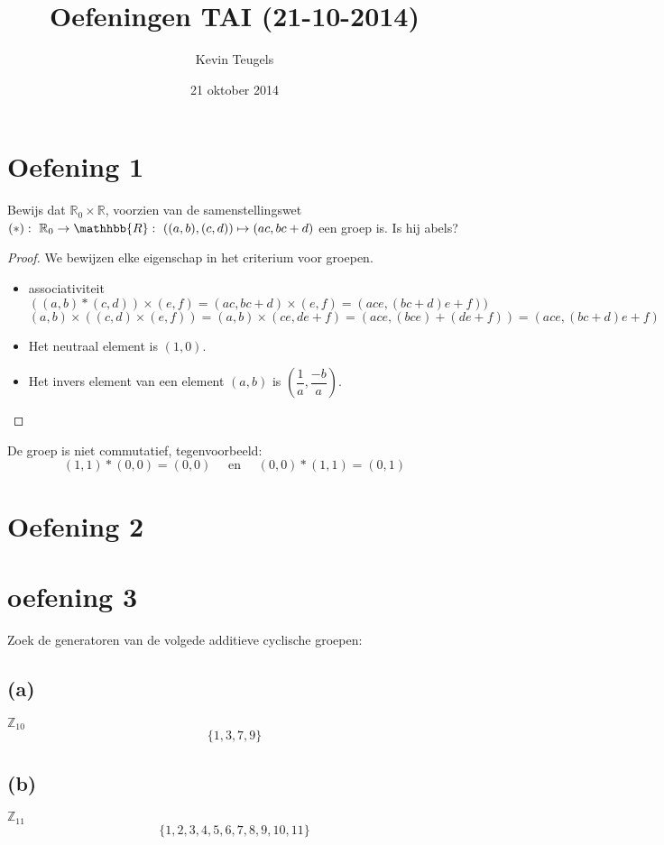 \documentclass[12pt,a4paper]{article}
\author{Kevin Teugels}
\title{Oefeningen TAI (21-10-2014)}
\date{21 oktober 2014}
\begin{document}
\maketitle
\section*{Oefening 1}

Bewijs dat $\mathbb{R}_0 \times \mathbb{R}$, voorzien van de samenstellingswet $(*):\ \mathbb{R}_{0}\rightarrow \mathhbb{R}:\ ((a,b),(c,d)) \mapsto (ac,bc+d)$ een groep is. Is hij abels?
\begin{proof} 
We bewijzen elke eigenschap in het criterium voor groepen.
\begin{itemize}
  \item associativiteit
  \[
  ((a,b)*(c,d))\times (e,f)=(ac,bc+d)\times (e,f)=(ace,(bc+d)e+f))
  \]
  \[
  (a,b) \times ((c,d) \times (e,f))=(a,b) \times
  (ce,de+f)=(ace,(bce)+(de+f))=(ace,(bc+d)e+f)
  \]
  \item Het neutraal element is $(1,0)$. 
  \item Het invers element van een element $(a,b)$ is  $(\dfrac{1}{a},\dfrac{-b}{a})$.
\end{itemize}
\end{proof}
De groep is niet commutatief, tegenvoorbeeld:
\[
(1,1)*(0,0) = (0,0) \quad\text{ en }\quad (0,0)*(1,1) = (0,1)
\]

\section*{Oefening 2}

\section*{oefening 3}
Zoek de generatoren van de volgede additieve cyclische groepen:
\subsection*{(a)}
$\mathbb{Z}_{10}$\\
\[ \{ 1,3,7,9\} \]

\subsection*{(b)}
$\mathbb{Z}_{11}$\\
\[ \{ 1,2,3,4,5,6,7,8,9,10,11 \} \]
\end{document}
